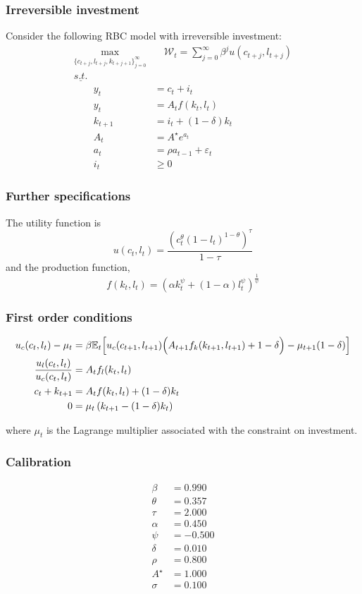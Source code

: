 \documentclass{beamer}
\begin{document}
\begin{frame}
  \frametitle{Irreversible investment}
Consider the following RBC model with irreversible investment:
\[
  \begin{split}
    \max_{\{c_{t+j},l_{t+j},k_{t+j+1}\}_{j=0}^{\infty}} &\quad \mathcal W_t = \sum_{j=0}^{\infty}\beta^ju(c_{t+j},l_{t+j})\\
           \underline{s.t.}   &  \\
              \qquad y_t &= c_t + i_t\\
              \qquad y_t &= A_tf(k_{t},l_t)\\
              \qquad k_{t+1} &= i_t + (1-\delta)k_{t}\\
              \qquad A_{t} &= {A^{\star}}e^{a_{t}}\\
              \qquad a_{t} &= \rho a_{t-1} + \varepsilon_t\\
              \qquad i_t &\ge 0
  \end{split}
\]
\end{frame}

\begin{frame}
\frametitle{Further specifications}
The utility function is
\[
  u(c_t,l_t) = \frac{\left(c_t^{\theta}(1-l_t)^{1-\theta}\right)^{\tau}}{1-\tau}
\]
and the production function,
\[
  f(k_{t},l_t) = \left(\alpha k_{t}^{\psi} + (1-\alpha)l_t^{\psi}\right)^{\frac{1}{\psi}}
\]
\end{frame}

\begin{frame}
\frametitle{First order conditions}
{\footnotesize\[
\begin{split}
  u_c(c_t,l_t) - \mu_t &= \beta \mathbb E_t\Big[
    u_c(c_{t+1},l_{t+1})\Bigl(A_{t+1}f_k(k_{t+1},l_{t+1}) + 1
    -\delta\Bigr) - \mu_{t+1}(1-\delta)\Big]\\
  \frac{u_{l}(c_t,l_t)}{u_c(c_t,l_t)} &= A_tf_l(k_t,l_t)\\
  c_t + k_{t+1} &= A_tf(k_{t},l_t) + (1-\delta)k_{t}\\
  0 &= \mu_t \left( k_{t+1} - (1-\delta)k_{t} \right)
\end{split}
\]}

\bigskip\bigskip

where $\mu_t$ is the Lagrange multiplier associated with the constraint on investment.
\end{frame}

\begin{frame}
  \frametitle{Calibration}
  \begin{align*}
    \beta    &=  0.990\\
    \theta   &=  0.357\\
    \tau     &=  2.000\\
    \alpha   &=  0.450\\
    \psi     &= -0.500\\
    \delta   &=  0.010\\
    \rho     &=  0.800\\
    A^\star &=  1.000\\
    \sigma   &=  0.100
  \end{align*}
\end{frame}
\end{document}
